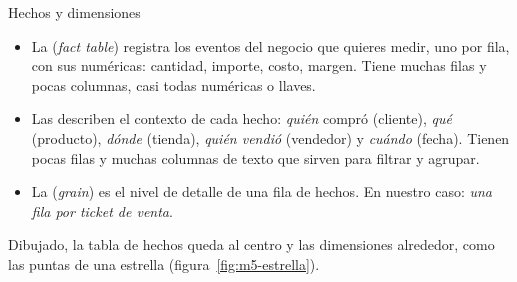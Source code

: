 \begin{concepto}{Hechos y dimensiones}
\begin{itemize}
  \item La  (\emph{fact table}) registra los
        eventos del negocio que quieres medir, uno por fila, con sus
         numéricas: cantidad, importe, costo, margen.
        Tiene muchas filas y pocas columnas, casi todas numéricas o
        llaves.
  \item Las  describen el contexto de cada
        hecho: \emph{quién} compró (cliente), \emph{qué} (producto),
        \emph{dónde} (tienda), \emph{quién vendió} (vendedor) y
        \emph{cuándo} (fecha). Tienen pocas filas y muchas columnas de
        texto que sirven para filtrar y agrupar.
  \item La  (\emph{grain}) es el nivel de detalle de
        una fila de hechos. En nuestro caso: \emph{una fila por ticket de
        venta}.
\end{itemize}
Dibujado, la tabla de hechos queda al centro y las dimensiones alrededor,
como las puntas de una estrella (figura~\ref{fig:m5-estrella}).
\end{concepto}

